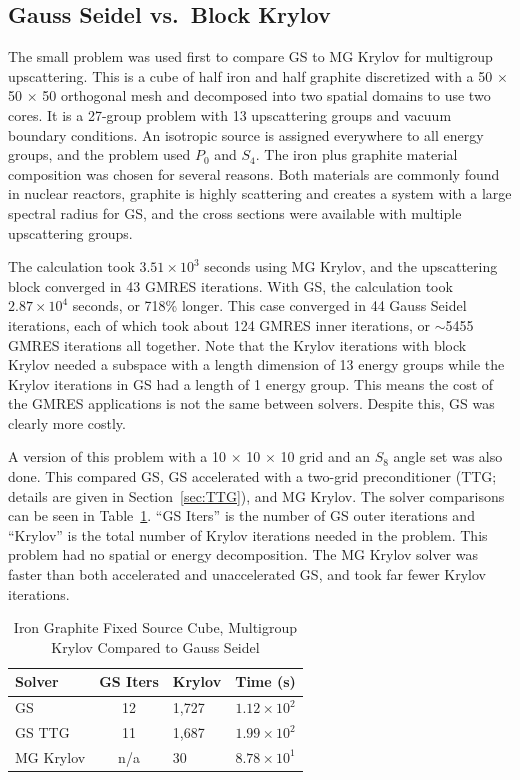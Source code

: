 \subsection{Gauss Seidel vs.\ Block Krylov}
The small problem was used first to compare GS to MG Krylov for multigroup upscattering. This is a cube of half iron and half graphite discretized with a 50 $\times$ 50 $\times$ 50 orthogonal mesh and decomposed into two spatial domains to use two cores. It is a 27-group problem with 13 upscattering groups and vacuum boundary conditions. An isotropic source is assigned everywhere to all energy groups, and the problem used $P_0$ and $S_4$. The iron plus graphite material composition was chosen for several reasons. Both materials are commonly found in nuclear reactors, graphite is highly scattering and creates a system with a large spectral radius for GS, and the cross sections were available with multiple upscattering groups.

The calculation took $3.51 \times 10^{3}$ seconds using MG Krylov, and the upscattering block converged in 43 GMRES iterations. With GS, the calculation took $2.87 \times 10^{4}$ seconds, or 718\% longer. This case converged in 44 Gauss Seidel iterations, each of which took about 124 GMRES inner iterations, or $\sim$5455 GMRES iterations all together. Note that the Krylov iterations with block Krylov needed a subspace with a length dimension of 13 energy groups while the Krylov iterations in GS had a length of 1 energy group. This means the cost of the GMRES applications is not the same between solvers. Despite this, GS was clearly more costly.

A version of this problem with a 10 $\times$ 10 $\times$ 10 grid and an $S_{8}$ angle set was also done. This compared GS, GS accelerated with a two-grid preconditioner (TTG; details are given in Section~\ref{sec:TTG}), and MG Krylov. The solver comparisons can be seen in Table~\ref{table:FeC GS Krylov}. ``GS Iters'' is the number of GS outer iterations and ``Krylov'' is the total number of Krylov iterations needed in the problem. This problem had no spatial or energy decomposition. The MG Krylov solver was faster than both accelerated and unaccelerated GS, and took far fewer Krylov iterations. 
%
\begin{table}[!h]
\caption{Iron Graphite Fixed Source Cube, Multigroup Krylov Compared to Gauss Seidel}
\begin{center}
\begin{tabular}{| l | c | l | c |}
\hline
Solver & GS Iters & Krylov & Time (s)\\[0.5ex]
\hline
GS &  12 & 1,727 & $1.12 \times 10^{2}$ \\
GS TTG & 11 & 1,687 & $1.99 \times 10^{2}$  \\
MG Krylov & n/a & 30 & $8.78 \times 10^{1}$ \\
\hline
\end{tabular}
\end{center}
\label{table:FeC GS Krylov}
\end{table}

